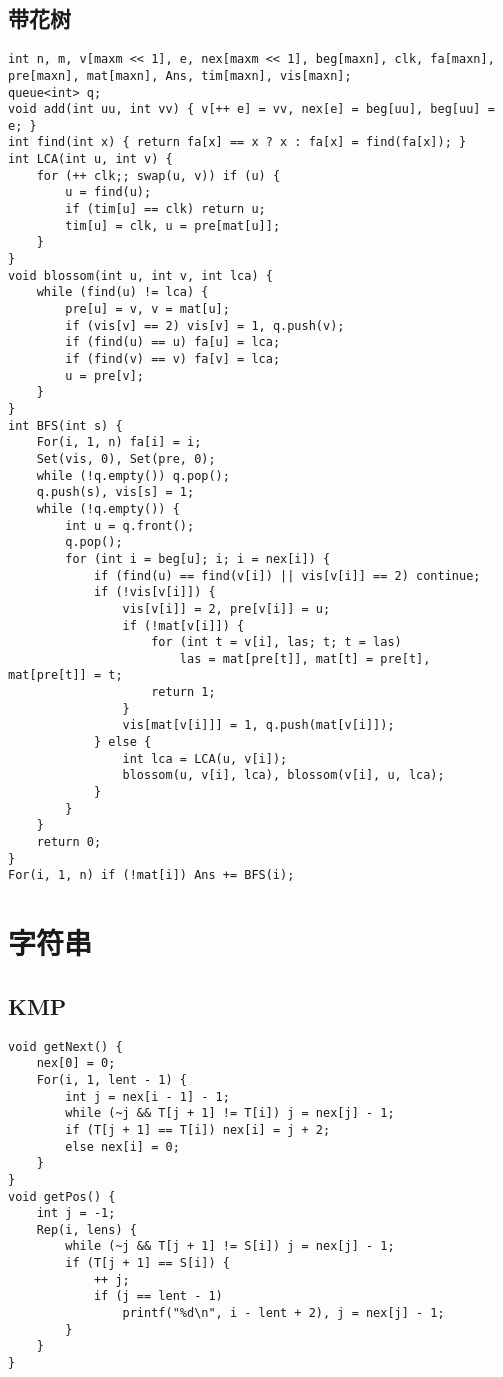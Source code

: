 \documentclass[twocolumn,a4]{article}
\begin{document}
\subsection{带花树}
\begin{lstlisting}
int n, m, v[maxm << 1], e, nex[maxm << 1], beg[maxn], clk, fa[maxn], pre[maxn], mat[maxn], Ans, tim[maxn], vis[maxn];
queue<int> q;
void add(int uu, int vv) { v[++ e] = vv, nex[e] = beg[uu], beg[uu] = e; }
int find(int x) { return fa[x] == x ? x : fa[x] = find(fa[x]); }
int LCA(int u, int v) {
	for (++ clk;; swap(u, v)) if (u) {
		u = find(u);
		if (tim[u] == clk) return u;
		tim[u] = clk, u = pre[mat[u]];
	}
}
void blossom(int u, int v, int lca) {
	while (find(u) != lca) {
		pre[u] = v, v = mat[u];
		if (vis[v] == 2) vis[v] = 1, q.push(v);
		if (find(u) == u) fa[u] = lca;
		if (find(v) == v) fa[v] = lca;
		u = pre[v];
	}
}
int BFS(int s) {
	For(i, 1, n) fa[i] = i;
	Set(vis, 0), Set(pre, 0);
	while (!q.empty()) q.pop();
	q.push(s), vis[s] = 1;
	while (!q.empty()) {
		int u = q.front();
		q.pop();
		for (int i = beg[u]; i; i = nex[i]) {
			if (find(u) == find(v[i]) || vis[v[i]] == 2) continue;
			if (!vis[v[i]]) {
				vis[v[i]] = 2, pre[v[i]] = u;
				if (!mat[v[i]]) {
					for (int t = v[i], las; t; t = las)
						las = mat[pre[t]], mat[t] = pre[t], mat[pre[t]] = t;
					return 1;
				}
				vis[mat[v[i]]] = 1, q.push(mat[v[i]]);
			} else {
				int lca = LCA(u, v[i]);
				blossom(u, v[i], lca), blossom(v[i], u, lca);
			}
		}
	}
	return 0;
}
For(i, 1, n) if (!mat[i]) Ans += BFS(i);
\end{lstlisting}

\section{字符串}
\subsection{KMP}
\begin{lstlisting}
void getNext() {
	nex[0] = 0;
	For(i, 1, lent - 1) {
		int j = nex[i - 1] - 1;
		while (~j && T[j + 1] != T[i]) j = nex[j] - 1;
		if (T[j + 1] == T[i]) nex[i] = j + 2;
		else nex[i] = 0;
	}
}
void getPos() {
	int j = -1;
	Rep(i, lens) {
		while (~j && T[j + 1] != S[i]) j = nex[j] - 1;
		if (T[j + 1] == S[i]) {
			++ j;
			if (j == lent - 1)
				printf("%d\n", i - lent + 2), j = nex[j] - 1;
		}
	}
}
\end{lstlisting}
\end{document}
